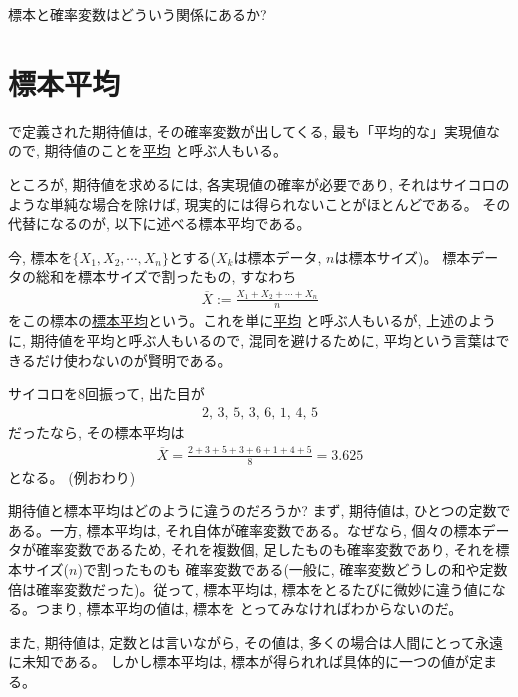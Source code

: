 \begin{q}\label{q:stat_sample_probV} 標本と確率変数はどういう関係にあるか?\end{q}
\vv



\section{標本平均}

で定義された期待値は, その確率変数が出してくる, 
最も「平均的な」実現値なので, 期待値のことを\underline{平均}
と呼ぶ人もいる。

ところが, 期待値を求めるには, 各実現値の確率が必要であり, それはサイコロの
ような単純な場合を除けば, 現実的には得られないことがほとんどである。
その代替になるのが, 以下に述べる標本平均である。

今, 標本を$\{X_1, X_2, \cdots, X_n\}$とする($X_k$は標本データ, $n$は標本サイズ)。
標本データの総和を標本サイズで割ったもの, すなわち
\begin{eqnarray}
\overline{X}:=\frac{X_1+X_2+\cdots+X_n}{n}\label{eq:arithmean}
\end{eqnarray}
をこの標本の\underline{標本平均}という。これを単に\underline{平均}
と呼ぶ人もいるが, 上述のように, 期待値を平均と呼ぶ人もいるので, 
混同を避けるために, 平均という言葉はできるだけ使わないのが賢明である。

\begin{exmpl}\label{ex:Dice_Sample_mean}
サイコロを8回振って, 出た目が
\begin{eqnarray*}2,\, 3,\, 5,\, 3,\, 6,\, 1,\, 4,\, 5\end{eqnarray*}
だったなら, その標本平均は
\begin{eqnarray*}
\overline{X}=\frac{2+3+5+3+6+1+4+5}{8}=3.625
\end{eqnarray*}
となる。
(例おわり)\end{exmpl}

期待値と標本平均はどのように違うのだろうか? まず, 期待値は, ひとつの定数である。一方, 
標本平均は, それ自体が確率変数である。なぜなら, 個々の標本データが確率変数であるため, 
それを複数個, 足したものも確率変数であり, それを標本サイズ($n$)で割ったものも
確率変数である(一般に, 確率変数どうしの和や定数倍は確率変数だった)。従って, 
標本平均は, 標本をとるたびに微妙に違う値になる。つまり, 標本平均の値は, 標本を
とってみなければわからないのだ。

また, 期待値は, 定数とは言いながら, その値は, 多くの場合は人間にとって永遠に未知である。
しかし標本平均は, 標本が得られれば具体的に一つの値が定まる。\\

